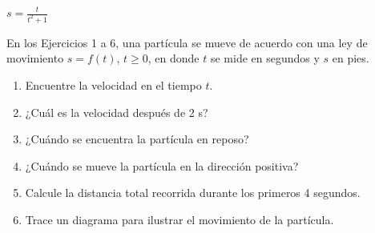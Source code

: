\item $s = \frac{t}{t^2 + 1}$
\par
En los Ejercicios 1 a 6, una partícula se mueve de acuerdo con una ley de movimiento $s = f(t)$, $t \ge 0$, en donde $t$ se mide en segundos y $s$ en pies.
\begin{enumerate}
    \item[(a)] Encuentre la velocidad en el tiempo $t$.
    \item[(b)] ¿Cuál es la velocidad después de 2 s?
    \item[(c)] ¿Cuándo se encuentra la partícula en reposo?
    \item[(d)] ¿Cuándo se mueve la partícula en la dirección positiva?
    \item[(e)] Calcule la distancia total recorrida durante los primeros 4 segundos.
    \item[(f)] Trace un diagrama para ilustrar el movimiento de la partícula.
\end{enumerate}
